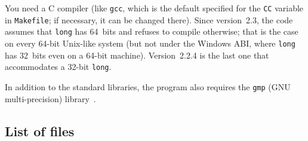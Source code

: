 \documentclass[12pt,a4paper,oneside]{amsart}
\begin{document}
You need a C compiler (like \texttt{gcc}, which is the default specified
for the \texttt{CC} variable in \texttt{Makefile}; if necessary, it can be
changed there). Since version~2.3, the code assumes that \texttt{long} has
64~bits and refuses to compile otherwise; that is the case on every 64-bit
Unix-like system (but not under the Windows ABI, where \texttt{long} has
32~bits even on a 64-bit machine). Version~2.2.4 is the last one that
accommodates a 32-bit \texttt{long}.

In addition to the standard libraries, the program also requires the
\texttt{gmp} (GNU multi-precision) library~\cite{gmp}.

\subsection{List of files}
\end{document}
